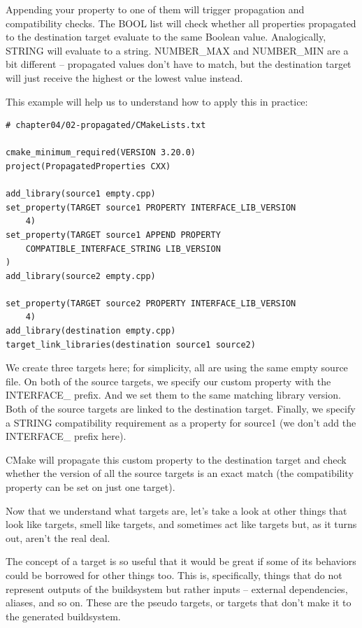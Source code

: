 Appending your property to one of them will trigger propagation and compatibility checks. The BOOL list will check whether all properties propagated to the destination target evaluate to the same Boolean value. Analogically, STRING will evaluate to a string. NUMBER\_MAX and NUMBER\_MIN are a bit different – propagated values don't have to match, but the destination target will just receive the highest or the lowest value instead.

This example will help us to understand how to apply this in practice:

\begin{lstlisting}[style=styleCMake]
# chapter04/02-propagated/CMakeLists.txt

cmake_minimum_required(VERSION 3.20.0)
project(PropagatedProperties CXX)

add_library(source1 empty.cpp)
set_property(TARGET source1 PROPERTY INTERFACE_LIB_VERSION
	4)
set_property(TARGET source1 APPEND PROPERTY
	COMPATIBLE_INTERFACE_STRING LIB_VERSION
)
add_library(source2 empty.cpp)

set_property(TARGET source2 PROPERTY INTERFACE_LIB_VERSION
	4)
add_library(destination empty.cpp)
target_link_libraries(destination source1 source2)
\end{lstlisting}

We create three targets here; for simplicity, all are using the same empty source file. On both of the source targets, we specify our custom property with the INTERFACE\_ prefix. And we set them to the same matching library version. Both of the source targets are linked to the destination target. Finally, we specify a STRING compatibility requirement as a property for source1 (we don't add the INTERFACE\_ prefix here).

CMake will propagate this custom property to the destination target and check whether the version of all the source targets is an exact match (the compatibility property can be set on just one target).

Now that we understand what targets are, let's take a look at other things that look like targets, smell like targets, and sometimes act like targets but, as it turns out, aren't the real deal.


The concept of a target is so useful that it would be great if some of its behaviors could be borrowed for other things too. This is, specifically, things that do not represent outputs of the buildsystem but rather inputs – external dependencies, aliases, and so on. These are the pseudo targets, or targets that don't make it to the generated buildsystem.

